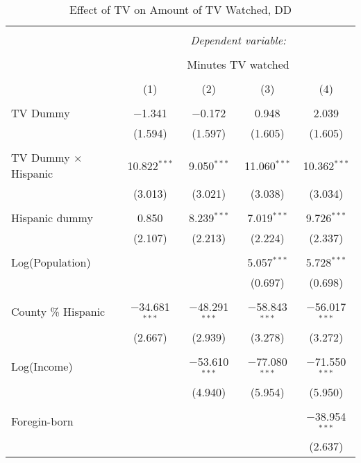 
\begin{table}[!htbp] \centering 
  \caption{Effect of TV on Amount of TV Watched, DD} 
  \label{} 
\begin{tabular}{@{\extracolsep{-5pt}}lcccc} 
\\[-1.8ex]\hline 
\hline \\[-1.8ex] 
 & \multicolumn{4}{c}{\textit{Dependent variable:}} \\ 
\cline{2-5} 
\\[-1.8ex] & \multicolumn{4}{c}{Minutes TV watched} \\ 
\\[-1.8ex] & (1) & (2) & (3) & (4)\\ 
\hline \\[-1.8ex] 
 TV Dummy & $-$1.341 & $-$0.172 & 0.948 & 2.039 \\ 
  & (1.594) & (1.597) & (1.605) & (1.605) \\ 
  & & & & \\ 
 TV Dummy $\times$ Hispanic  & 10.822$^{***}$ & 9.050$^{***}$ & 11.060$^{***}$ & 10.362$^{***}$ \\ 
  & (3.013) & (3.021) & (3.038) & (3.034) \\ 
  & & & & \\ 
 Hispanic dummy & 0.850 & 8.239$^{***}$ & 7.019$^{***}$ & 9.726$^{***}$ \\ 
  & (2.107) & (2.213) & (2.224) & (2.337) \\ 
  & & & & \\ 
 Log(Population) &  &  & 5.057$^{***}$ & 5.728$^{***}$ \\ 
  &  &  & (0.697) & (0.698) \\ 
  & & & & \\ 
 County \% Hispanic & $-$34.681$^{***}$ & $-$48.291$^{***}$ & $-$58.843$^{***}$ & $-$56.017$^{***}$ \\ 
  & (2.667) & (2.939) & (3.278) & (3.272) \\ 
  & & & & \\ 
 Log(Income) &  & $-$53.610$^{***}$ & $-$77.080$^{***}$ & $-$71.550$^{***}$ \\ 
  &  & (4.940) & (5.954) & (5.950) \\ 
  & & & & \\ 
 Foregin-born &  &  &  & $-$38.954$^{***}$ \\ 
  &  &  &  & (2.637) \\ 

\end{tabular}
\end{table}
